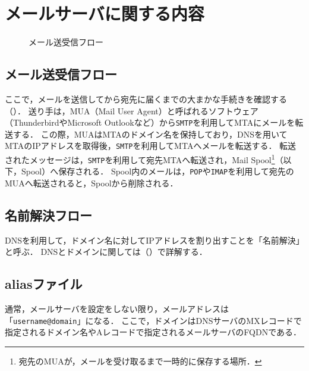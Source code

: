 \chapter{メールサーバに関する内容}
\begin{wrapfigure}{r}[0mm]{.43\textwidth}
    
    \caption{メール送受信フロー}
    \label{fig:メール送受信フロー}
    \vspace{-1cm}
\end{wrapfigure}
\newcommand{\smtp}{\texttt{SMTP}}
\newcommand{\pop}{\texttt{POP}}
\newcommand{\imap}{\texttt{IMAP}}
\section{メール送受信フロー}
ここで，メールを送信してから宛先に届くまでの大まかな手続きを確認する（）．
送り手は，MUA（Mail User Agent）と呼ばれるソフトウェア（ThunderbirdやMicrosoft Outlookなど）から\smtp を利用してMTAにメールを転送する．
この際，MUAはMTAのドメイン名を保持しており，DNSを用いてMTAのIPアドレスを取得後，\smtp を利用してMTAへメールを転送する．
転送されたメッセージは，\smtp を利用して宛先MTAへ転送され，Mail Spool\footnote{宛先のMUAが，メールを受け取るまで一時的に保存する場所．}（以下，Spool）へ保存される．
Spool内のメールは，\pop や\imap を利用して宛先のMUAへ転送されると，Spoolから削除される．
\section{名前解決フロー}
DNSを利用して，ドメイン名に対してIPアドレスを割り出すことを「名前解決」と呼ぶ．
DNSとドメインに関しては（）で詳解する．
\section{aliasファイル}
通常，メールサーバを設定をしない限り，メールアドレスは「\texttt{username@domain}」になる．
ここで，ドメインはDNSサーバのMXレコードで指定されるドメイン名やAレコードで指定されるメールサーバのFQDNである．
